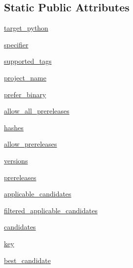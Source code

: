 \subsection*{Static Public Attributes}
\begin{DoxyCompactItemize}
\item 
\hyperlink{classpip_1_1__internal_1_1index_1_1package__finder_1_1CandidateEvaluator_abc38faebda230a8c30517eff891d53eb}{target\+\_\+python}
\item 
\hyperlink{classpip_1_1__internal_1_1index_1_1package__finder_1_1CandidateEvaluator_a18ce0a811b4cc1802bfc515cdfc4510d}{specifier}
\item 
\hyperlink{classpip_1_1__internal_1_1index_1_1package__finder_1_1CandidateEvaluator_ad4d95a6503923d16f9f70cf52d235dc4}{supported\+\_\+tags}
\item 
\hyperlink{classpip_1_1__internal_1_1index_1_1package__finder_1_1CandidateEvaluator_a67237f5d65e74c3562f25d5891b1ed87}{project\+\_\+name}
\item 
\hyperlink{classpip_1_1__internal_1_1index_1_1package__finder_1_1CandidateEvaluator_ad615d0c0d34bdb4bb571225fcd5b4853}{prefer\+\_\+binary}
\item 
\hyperlink{classpip_1_1__internal_1_1index_1_1package__finder_1_1CandidateEvaluator_ad35073e3d37c1b4d9b51e98cb8763b1c}{allow\+\_\+all\+\_\+prereleases}
\item 
\hyperlink{classpip_1_1__internal_1_1index_1_1package__finder_1_1CandidateEvaluator_a29272f962e4a4e1062774f52df09103f}{hashes}
\item 
\hyperlink{classpip_1_1__internal_1_1index_1_1package__finder_1_1CandidateEvaluator_a9847505063ad1ef8d09f23de16ad2db6}{allow\+\_\+prereleases}
\item 
\hyperlink{classpip_1_1__internal_1_1index_1_1package__finder_1_1CandidateEvaluator_a9f4d6cf5c420f0971939b3da14133d04}{versions}
\item 
\hyperlink{classpip_1_1__internal_1_1index_1_1package__finder_1_1CandidateEvaluator_a261008b737affdfd564336891dfaee49}{prereleases}
\item 
\hyperlink{classpip_1_1__internal_1_1index_1_1package__finder_1_1CandidateEvaluator_aa52bcb663d7871e1e97ea6651ce645e1}{applicable\+\_\+candidates}
\item 
\hyperlink{classpip_1_1__internal_1_1index_1_1package__finder_1_1CandidateEvaluator_af9508183b571ab2382e602ef0f13209c}{filtered\+\_\+applicable\+\_\+candidates}
\item 
\hyperlink{classpip_1_1__internal_1_1index_1_1package__finder_1_1CandidateEvaluator_ad5c22821be2a753d7b76e3c9106d996e}{candidates}
\item 
\hyperlink{classpip_1_1__internal_1_1index_1_1package__finder_1_1CandidateEvaluator_a018f7010670443449fd3dc289868f64f}{key}
\item 
\hyperlink{classpip_1_1__internal_1_1index_1_1package__finder_1_1CandidateEvaluator_a448e91412064e52c3e58002f9090b0f9}{best\+\_\+candidate}
\end{DoxyCompactItemize}


